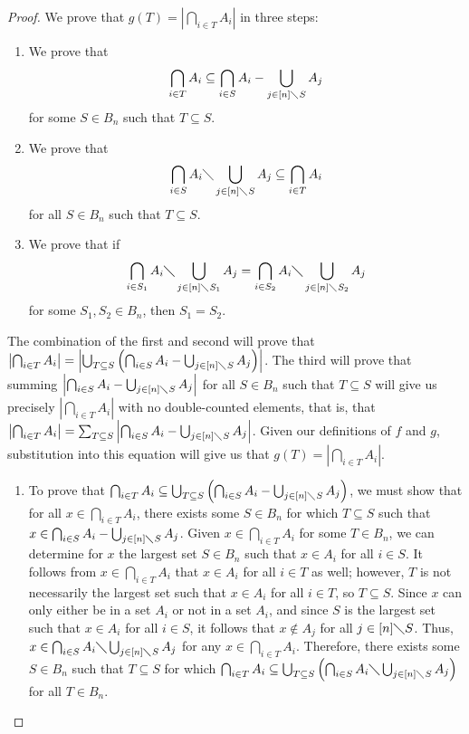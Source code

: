 \documentclass{article} %
\theoremstyle{definition}
\theoremstyle{plain}
\begin{document}
\begin{proof}
We prove that $g(T)=\left|\bigcap_{i\in T}A_i\right|$ in three steps: 
\begin{enumerate}
\item{We prove that $$\bigcap_{i\in T}A_i\subseteq \bigcap_{i\in S}A_i-\bigcup_{j\in [n]\diagdown S}A_j$$ for some $S\in B_n$ such that $T\subseteq S$.}
\item{We prove that 
$$\bigcap_{i\in S}A_i\diagdown\bigcup_{j\in [n]\diagdown S}A_j\subseteq \bigcap_{i\in T}A_i$$ for all $S\in B_n$ such that $T\subseteq S$.} 
\item{We prove that if $$\bigcap_{i\in S_1}A_i\diagdown\bigcup_{j\in [n]\diagdown S_1}A_j=\bigcap_{i\in S_2}A_i\diagdown\bigcup_{j\in [n]\diagdown S_2}A_j$$ for some $S_1,S_2\in B_n$, then $S_1=S_2$.}
\end{enumerate}
The combination of the first and second will prove that $\left|\bigcap_{i\in T}A_i\right|=\left|\bigcup_{T\subseteq S}\left(\bigcap_{i\in S}A_i-\bigcup_{j\in [n]\diagdown S}A_j\right)\right|$. The third will prove that summing $\left|\bigcap_{i\in S}A_i-\bigcup_{j\in [n]\diagdown S}A_j\right|$ for all $S\in B_n$ such that $T\subseteq S$ will give us precisely $\left|\bigcap_{i\in T}A_i\right|$ with no double-counted elements, that is, that $\left|\bigcap_{i\in T}A_i\right|=\sum_{T\subseteq S}\left|\bigcap_{i\in S}A_i-\bigcup_{j\in [n]\diagdown S}A_j\right|$. Given our definitions of $f$ and $g$, substitution into this equation will give us that $g(T)=\left|\bigcap_{i\in T}A_i\right|$.
\begin{enumerate}
\item{To prove that $\bigcap_{i\in T}A_i\subseteq \bigcup_{T\subseteq S}\left(\bigcap_{i\in S}A_i-\bigcup_{j\in [n]\diagdown S}A_j\right)$, we must show that for all $x\in \bigcap_{i\in T}A_i$, there exists some $S\in B_n$ for which $T\subseteq S$ such that $x\in \bigcap_{i\in S}A_i-\bigcup_{j\in [n]\diagdown S}A_j$. Given $x\in\bigcap_{i\in T}A_i$ for some $T\in B_n$, we can determine for $x$ the largest set $S\in B_n$ such that $x\in A_i$ for all $i\in S$. It follows from $x\in\bigcap_{i\in T}A_i$ that $x\in A_i$ for all $i\in T$ as well; however, $T$ is not necessarily the largest set such that $x\in A_i$ for all $i\in T$, so $T\subseteq S$. Since $x$ can only either be in a set $A_i$ or not in a set $A_i$, and since $S$ is the largest set such that $x\in A_i$ for all $i\in S$, it follows that $x\not\in A_j$ for all $j\in [n]\diagdown S$. Thus, $x\in\bigcap_{i\in S}A_i\diagdown\bigcup_{j\in [n]\diagdown S}A_j$ for any $x\in \bigcap_{i\in T}A_i$. Therefore, there exists some $S\in B_n$ such that $T\subseteq S$ for which $\bigcap_{i\in T}A_i\subseteq \bigcup_{T\subseteq S}\left(\bigcap_{i\in S}A_i\diagdown\bigcup_{j\in [n]\diagdown S}A_j\right)$ for all $T\in B_n$.}

\end{enumerate}
\end{proof}
\end{document}
